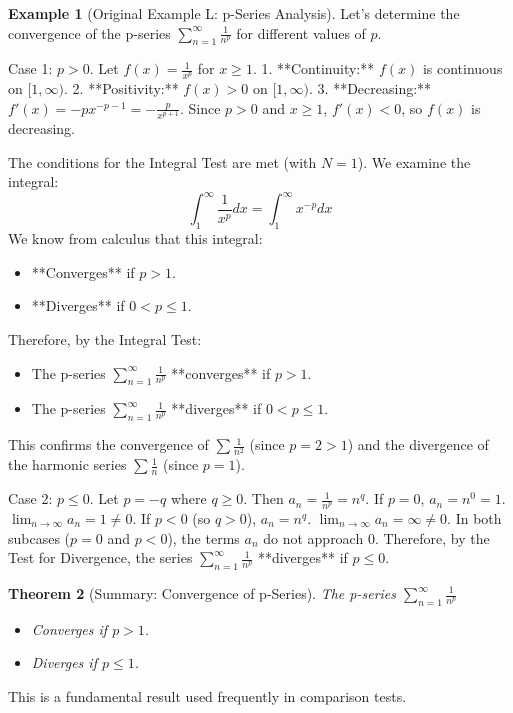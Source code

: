\documentclass[11pt]{article}
\theoremstyle{plain}
\newtheorem{theorem}{Theorem}[section]
\theoremstyle{definition}
\newtheorem{example}[theorem]{Example}
\theoremstyle{remark}
\theoremstyle{adminstyle}
\begin{document}
\begin{example}[Original Example L: p-Series Analysis] \label{ex:integral_test_p_series}
Let's determine the convergence of the p-series $\sum_{n=1}^{\infty} \frac{1}{n^p}$ for different values of $p$.

Case 1: $p > 0$.
Let $f(x) = \frac{1}{x^p}$ for $x \ge 1$.
1.  **Continuity:** $f(x)$ is continuous on $[1, \infty)$.
2.  **Positivity:** $f(x) > 0$ on $[1, \infty)$.
3.  **Decreasing:** $f'(x) = -p x^{-p-1} = -\frac{p}{x^{p+1}}$. Since $p>0$ and $x \ge 1$, $f'(x) < 0$, so $f(x)$ is decreasing.

The conditions for the Integral Test are met (with $N=1$). We examine the integral:
\[ \int_1^\infty \frac{1}{x^p} dx = \int_1^\infty x^{-p} dx \]
We know from calculus that this integral:
\begin{itemize}
    \item **Converges** if $p > 1$.
    \item **Diverges** if $0 < p \le 1$.
\end{itemize}
Therefore, by the Integral Test:
\begin{itemize}
    \item The p-series $\sum_{n=1}^{\infty} \frac{1}{n^p}$ **converges** if $p > 1$.
    \item The p-series $\sum_{n=1}^{\infty} \frac{1}{n^p}$ **diverges** if $0 < p \le 1$.
\end{itemize}
This confirms the convergence of $\sum \frac{1}{n^2}$ (since $p=2>1$) and the divergence of the harmonic series $\sum \frac{1}{n}$ (since $p=1$).

Case 2: $p \le 0$.
Let $p = -q$ where $q \ge 0$. Then $a_n = \frac{1}{n^p} = n^q$.
If $p=0$, $a_n = n^0 = 1$. $\lim_{n\to\infty} a_n = 1 \neq 0$.
If $p < 0$ (so $q > 0$), $a_n = n^q$. $\lim_{n\to\infty} a_n = \infty \neq 0$.
In both subcases ($p=0$ and $p<0$), the terms $a_n$ do not approach 0.
Therefore, by the Test for Divergence, the series $\sum_{n=1}^{\infty} \frac{1}{n^p}$ **diverges** if $p \le 0$.
\end{example}

\begin{theorem}[Summary: Convergence of p-Series]
The p-series $\sum_{n=1}^{\infty} \frac{1}{n^p}$
\begin{itemize}
    \item Converges if $p > 1$.
    \item Diverges if $p \le 1$.
\end{itemize}
\end{theorem}
This is a fundamental result used frequently in comparison tests.
\end{document}
